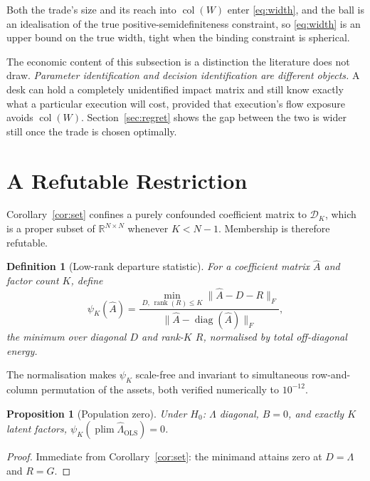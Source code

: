 \documentclass[10pt,twocolumn]{article}
\newtheorem{proposition}{Proposition}
\newtheorem{definition}{Definition}
\theoremstyle{remark}
\newcommand{\R}{\mathbb{R}}
\newcommand{\plim}{\operatorname{plim}}
\newcommand{\rank}{\operatorname{rank}}
\newcommand{\col}{\operatorname{col}}
\newcommand{\diag}{\operatorname{diag}}
\begin{document}
Both the trade's size and its reach into $\col(W)$ enter \eqref{eq:width}, and
the ball is an idealisation of the true positive-semidefiniteness constraint,
so \eqref{eq:width} is an upper bound on the true width, tight when the binding
constraint is spherical.

The economic content of this subsection is a distinction the literature does
not draw. \emph{Parameter identification and decision identification are
different objects.} A desk can hold a completely unidentified impact matrix and
still know exactly what a particular execution will cost, provided that
execution's flow exposure avoids $\col(W)$. Section~\ref{sec:regret} shows the
gap between the two is wider still once the trade is chosen optimally.

\section{A Refutable Restriction}
\label{sec:diagnostic}

Corollary~\ref{cor:set} confines a purely confounded coefficient matrix to
$\mathcal D_K$, which is a proper subset of $\R^{N\times N}$ whenever
$K<N-1$. Membership is therefore refutable.

\begin{definition}[Low-rank departure statistic]
\label{def:psi}
For a coefficient matrix $\widehat A$ and factor count $K$, define
\begin{equation}
\psi_K(\widehat A)
=\frac{\min_{D,\,\rank(R)\le K}\bigl\|\widehat A-D-R\bigr\|_F}
       {\bigl\|\widehat A-\diag(\widehat A)\bigr\|_F},
\label{eq:psi}
\end{equation}
the minimum over diagonal $D$ and rank-$K$ $R$, normalised by total
off-diagonal energy.
\end{definition}

The normalisation makes $\psi_K$ scale-free and invariant to simultaneous
row-and-column permutation of the assets, both verified numerically to
$10^{-12}$.

\begin{proposition}[Population zero]
\label{prop:psizero}
Under $H_0$: $\Lambda$ diagonal, $B=0$, and exactly $K$ latent factors,
$\psi_K(\plim\widehat\Lambda_{\mathrm{OLS}})=0$.
\end{proposition}

\begin{proof}
Immediate from Corollary~\ref{cor:set}: the minimand attains zero at $D=\Lambda$
and $R=G$.
\end{proof}
\end{document}
